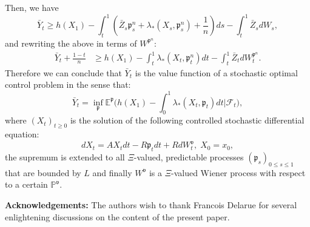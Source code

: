 \documentclass[reqno,a4paper,11 pt]{article}
\def \E {\mathbb{E}}
\numberwithin{equation}{section}
\begin{document}
Then, we have 
$$\bar{Y}_t\geq  h(X_1)  -\int_t^1 \left(\bar{Z}_s \mathfrak{p}^n_s+\lambda_*(X_s, \mathfrak{p}^n_s)+\frac{1}{n}\right) ds -\int_t^1 \bar{Z}_sdW_s,
$$ 
and rewriting the above in terms of $W^{\mathfrak{p}^n}$:
\begin{equation*}
\begin{split}
\bar{Y}_{t} +\frac{1-t}{n} &\geq h(X_1)- \int_t^1  \lambda_*(X_{t},\mathfrak{p}_{t}^n) dt  - \int_t^1\bar Z_{t} dW^{\mathfrak{p}^n}_{t}.
\end{split}
\end{equation*}
Therefore we can conclude that $\bar{Y}_{t}$ is the value function of a stochastic optimal control problem in the sense that:
\begin{equation*}
\bar{Y}_{t} = \inf_{\mathfrak{p}} \E^{\mathfrak{p}}  \biggl( h(X_{1}) - \int_{0}^1 \lambda_*(X_{t},\mathfrak{p}_{t}) dt \bigg | \mathcal{F}_t \biggr),
\end{equation*}
where $(X_t)_{t\geq 0} $ is the solution of the following controlled
stochastic differential equation: 
$$dX_t=AX_t dt -R\mathfrak{p}_t dt +R dW^{\mathfrak{v}}_t, \; X_0=x_0,$$
 the supremum is extended to all $\Xi$-valued, predictable processes 
$(\mathfrak{p}_s)_{0 \leq s \leq 1}$ that are bounded by $L$ and finally $W^{\mathfrak{v}}$ is a $\Xi$-valued Wiener process with respect to a certain $\mathbb{P}^{\mathfrak{v}}$.

\medskip

\textbf{Acknowledgements:}  The authors wish to thank Francois Delarue for several 
enlightening discussions on the content of the present paper.

\end{document}
